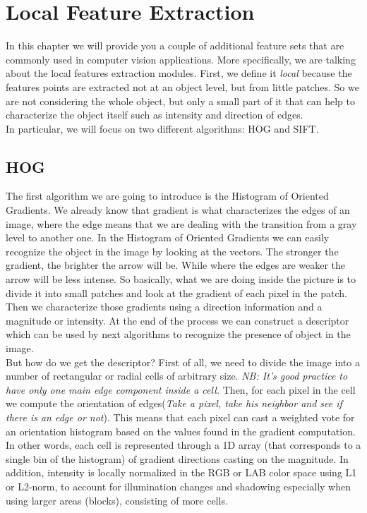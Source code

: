 \chapter{Local Feature Extraction}
In this chapter we will provide you a couple of additional feature sets that are commonly used in computer vision applications.
More specifically, we are talking about the local features extraction modules. 
First, we define it \textit{local} because the features points are extracted not at an object level, but from little patches. 
So we are not considering the whole object, but only a small part of it that can help to characterize the object itself such as intensity and direction of edges.
\\
In particular, we will focus on two different algorithms: HOG and SIFT.
\section{HOG}
The first algorithm we are going to introduce is the Histogram of Oriented Gradients.
We already know that gradient is what characterizes the edges of an image, where the edge means that we are dealing with the transition from a gray level to another one.
In the Histogram of Oriented Gradients we can easily recognize the object in the image by looking at the vectors. The stronger the gradient, the brighter the arrow will be.
While where the edges are weaker the arrow will be less intense.
So basically, what we are doing inside the picture is to divide it into small patches and look at the gradient of each pixel in the patch.
Then we characterize those gradients using a direction information and a magnitude or intensity.
At the end of the process we can construct a descriptor which can be used by next algorithms to recognize the presence of object in the image.
\\But how do we get the descriptor?
First of all, we need to divide the image into a number of rectangular or radial cells of arbitrary size.
\textit{NB: It's good practice to have only one main edge component inside a cell.} Then, for each pixel in the cell we compute the orientation of edges(\textit{Take a pixel, take his neighbor and see if there is an edge or not}).
This means that each pixel can cast a weighted vote for an orientation histogram based on the values found in the gradient computation.
In other words, each cell is represented through a 1D array (that corresponds to a single bin of the histogram) of gradient directions casting on the magnitude.
In addition, intensity is locally normalized in the RGB or LAB color space using L1 or L2-norm, to account for illumination changes and shadowing especially when using larger areas (blocks), consisting of more cells.
